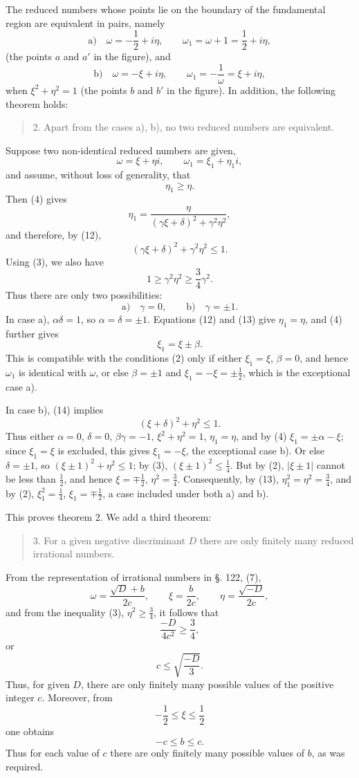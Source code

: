 \documentclass[11pt]{article}
\begin{document}
The reduced numbers whose points lie on the boundary of the fundamental region are equivalent in pairs, namely
\[
\text{a)}\quad \omega=-\frac12+i\eta,
\qquad
\omega_1=\omega+1=\frac12+i\eta,
\]
(the points $a$ and $a'$ in the figure), and
\[
\text{b)}\quad \omega=-\xi+i\eta,
\qquad
\omega_1=-\frac1\omega=\xi+i\eta,
\]
when $\xi^2+\eta^2=1$ (the points $b$ and $b'$ in the figure). In addition, the following theorem holds:

\begin{quote}
2. Apart from the cases a), b), no two reduced numbers are equivalent.
\end{quote}

Suppose two non-identical reduced numbers are given,
\[
\tag{11}       \omega=\xi+\eta i,
        \qquad
        \omega_1=\xi_1+\eta_1 i,
\]
and assume, without loss of generality, that
\[
\tag{12}       \eta_1\ge\eta.
\]
Then (4) gives
\[
\tag{13}       \eta_1=
\frac{\eta}{(\gamma\xi+\delta)^2+\gamma^2\eta^2},
\]
and therefore, by (12),
\[
\tag{14}       (\gamma\xi+\delta)^2+\gamma^2\eta^2\le1.
\]
Using (3), we also have
\[
\tag{15}       1\ge \gamma^2\eta^2\ge \frac34\gamma^2.
\]
Thus there are only two possibilities:
\[
        \text{a)}\quad \gamma=0,
        \qquad
        \text{b)}\quad \gamma=\pm1.
\]
In case a), $\alpha\delta=1$, so $\alpha=\delta=\pm1$. Equations (12) and (13) give $\eta_1=\eta$, and (4) further gives
\[
        \xi_1=\xi\pm\beta.
\]
This is compatible with the conditions (2) only if either $\xi_1=\xi$, $\beta=0$, and hence $\omega_1$ is identical with $\omega$, or else $\beta=\pm1$ and $\xi_1=-\xi=\pm\frac12$, which is the exceptional case a).

In case b), (14) implies
\[
        (\xi+\delta)^2+\eta^2\le1.
\]
Thus either $\alpha=0$, $\delta=0$, $\beta\gamma=-1$, $\xi^2+\eta^2=1$, $\eta_1=\eta$, and by (4) $\xi_1=\pm\alpha-\xi$; since $\xi_1=\xi$ is excluded, this gives $\xi_1=-\xi$, the exceptional case b). Or else $\delta=\pm1$, so $(\xi\pm1)^2+\eta^2\le1$; by (3), $(\xi\pm1)^2\le\frac14$. But by (2), $|\xi\pm1|$ cannot be less than $\frac12$, and hence $\xi=\mp\frac12$, $\eta^2=\frac34$. Consequently, by (13), $\eta_1^2=\eta^2=\frac34$, and by (2), $\xi_1^2=\frac14$, $\xi_1=\mp\frac12$, a case included under both a) and b).

This proves theorem 2. We add a third theorem:
\begin{quote}
3. For a given negative discriminant $D$ there are only finitely many reduced irrational numbers.
\end{quote}
From the representation of irrational numbers in §. 122, (7),
\[
        \omega=\frac{\sqrt D+b}{2c},
        \qquad
        \xi=\frac b{2c},
        \qquad
        \eta=\frac{\sqrt{-D}}{2c},
\]
and from the inequality (3), $\eta^2\ge\frac34$, it follows that
\[
        \frac{-D}{4c^2}\ge\frac34,
\]
or
\[
        c\le \sqrt{\frac{-D}{3}}.
\]
Thus, for given $D$, there are only finitely many possible values of the positive integer $c$. Moreover, from
\[
        -\frac12\le\xi\le\frac12
\]
one obtains
\[
        -c\le b\le c.
\]
Thus for each value of $c$ there are only finitely many possible values of $b$, as was required.
\end{document}
